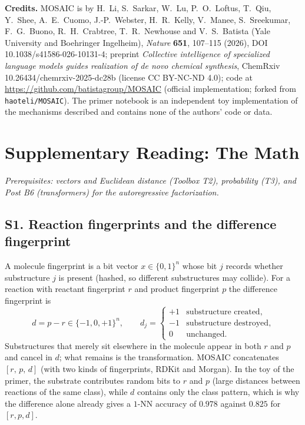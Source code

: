 \documentclass[11pt]{article}
\begin{document}
\vspace{0.5em}
{\footnotesize\textbf{Credits.} MOSAIC is by H.~Li, S.~Sarkar, W.~Lu, P.~O.~Loftus, T.~Qiu, Y.~Shee, A.~E.~Cuomo, J.-P.~Webster, H.~R.~Kelly, V.~Manee, S.~Sreekumar, F.~G.~Buono, R.~H.~Crabtree, T.~R.~Newhouse and V.~S.~Batista (Yale University and Boehringer Ingelheim), \emph{Nature} \textbf{651}, 107--115 (2026), DOI 10.1038/s41586-026-10131-4; preprint \emph{Collective intelligence of specialized language models guides realization of de novo chemical synthesis}, ChemRxiv 10.26434/chemrxiv-2025-dc28b (license CC BY-NC-ND 4.0); code at \url{https://github.com/batistagroup/MOSAIC} (official implementation; forked from \texttt{haoteli/MOSAIC}). The primer notebook is an independent toy implementation of the mechanisms described and contains none of the authors' code or data.}

\clearpage
\section*{Supplementary Reading: The Math}
\textit{Prerequisites: vectors and Euclidean distance (Toolbox T2), probability (T3), and Post B6 (transformers) for the autoregressive factorization.}

\label{sec:S1}
\subsection*{S1. Reaction fingerprints and the difference fingerprint}
A molecule fingerprint is a bit vector $x\in\{0,1\}^n$ whose bit $j$ records whether substructure $j$ is present (hashed, so different substructures may collide). For a reaction with reactant fingerprint $r$ and product fingerprint $p$ the difference fingerprint is
\[
  d=p-r\in\{-1,0,+1\}^n,\qquad d_j=\begin{cases}+1&\text{substructure created},\\-1&\text{substructure destroyed},\\0&\text{unchanged}.\end{cases}
\]
Substructures that merely sit elsewhere in the molecule appear in both $r$ and $p$ and cancel in $d$; what remains is the transformation. MOSAIC concatenates $[r,\,p,\,d]$ (with two kinds of fingerprints, RDKit and Morgan). In the toy of the primer, the substrate contributes random bits to $r$ and $p$ (large distances between reactions of the same class), while $d$ contains only the class pattern, which is why the difference alone already gives a $1$-NN accuracy of $0.978$ against $0.825$ for $[r,p,d]$.
\end{document}
